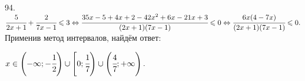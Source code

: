 94. $\cfrac{5}{2x+1}+\cfrac{2}{7x-1}\leqslant3\Leftrightarrow\cfrac{35x-5+4x+2-42x^2+6x-21x+3}{(2x+1)(7x-1)}\leqslant 0\Leftrightarrow
\cfrac{6x(4-7x)}{(2x+1)(7x-1)}\leqslant 0.$ Применив метод интервалов, найдём ответ:
\begin{figure}[ht!]
\end{figure}
$x\in\left(-\infty;-\cfrac{1}{2}\right)\cup\left[0;\cfrac{1}{7}\right)\cup\left(\cfrac{4}{7};+\infty\right).$\\
